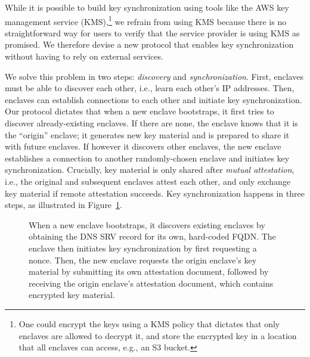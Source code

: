 While it is possible to build key synchronization using tools like the AWS key
management service (KMS),\footnote{One could encrypt the keys using a KMS
policy that dictates that only enclaves are allowed to decrypt it, and store
the encrypted key in a location that all enclaves can access, e.g., an S3
bucket.} we refrain from using KMS because there is no straightforward way for
users to verify that the service provider is using KMS as promised.  We
therefore devise a new protocol that enables key synchronization without having
to rely on external services.

We solve this problem in two steps: \emph{discovery} and
\emph{synchronization}.  First, enclaves must be able to discover each other,
i.e., learn each other's IP addresses.  Then, enclaves can establish
connections to each other and initiate key synchronization.  Our protocol
dictates that when a new enclave bootstraps, it first tries to discover
already-existing enclaves.  If there are none, the enclave knows that it is the
``origin'' enclave; it generates new key material and is prepared to share it
with future enclaves.  If however it discovers other enclaves, the new enclave
establishes a connection to another randomly-chosen enclave and initiates key
synchronization.  Crucially, key material is only shared after \emph{mutual
attestation}, i.e., the original and subsequent enclaves attest each other, and
only exchange key material if remote attestation succeeds.  Key synchronization
happens in three steps, as illustrated in Figure~\ref{fig:key-synchronization}.

\begin{figure}[t]
  \centering
  
  \caption{When a new enclave bootstraps, it discovers existing enclaves by
    obtaining the DNS SRV record for its own, hard-coded FQDN.  The enclave then
    initiates key synchronization by first requesting a nonce.  Then, the new
    enclave requests the origin enclave's key material by submitting its own
    attestation document, followed by receiving the origin enclave's attestation
    document, which contains encrypted key material.}
  \label{fig:key-synchronization}
\end{figure}

